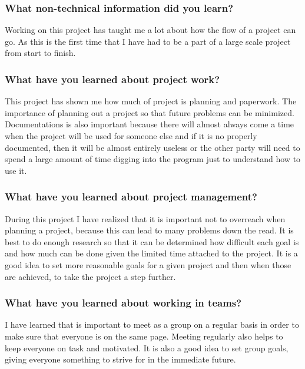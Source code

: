 \documentclass[onecolumn, draftclsnofoot,10pt, compsoc]{IEEEtran}
\begin{document}
\subsubsection{What non-technical information did you learn?}

Working on this project has taught me a lot about how the flow of a project can go.
As this is the first time that I have had to be a part of a large scale project from start to finish.


\subsubsection{What have you learned about project work?}

This project has shown me how much of project is planning and paperwork.
The importance of planning out a project so that future problems can be minimized.
Documentations is also important because there will almost always come a time when the project will be used for someone else and if it is no properly documented, then it will be almost entirely useless or the other party will need to spend a large amount of time digging into the program just to understand how to use it.

\subsubsection{What have you learned about project management?}

During this project I have realized that it is important not to overreach when planning a project, because this can lead to many problems down the read.
It is best to do enough research so that it can be determined how difficult each goal is and how much can be done given the limited time attached to the project.
It is a good idea to set more reasonable goals for a given project and then when those are achieved, to take the project a step further.

\subsubsection{What have you learned about working in teams?}

I have learned that is important to meet as a group on a regular basis in order to make sure that everyone is on the same page.
Meeting regularly also helps to keep everyone on task and motivated.
It is also a good idea to set group goals, giving everyone something to strive for in the immediate future.
\end{document}
